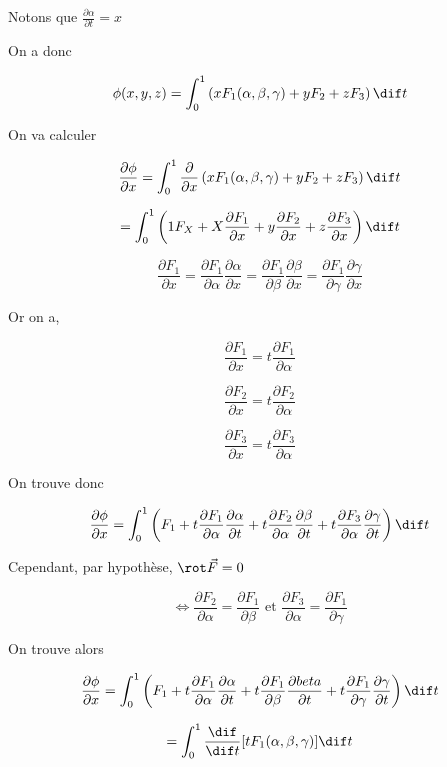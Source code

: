 Notons que $\frac{\partial \alpha}{\partial t} = x$

On a donc

\[\phi (x,y,z) = \int_0^1 \left( x F_1 (\alpha, \beta, \gamma ) + y F_2 + z F_3 \right) \dif t \]

On va calculer

\[\frac{\partial \phi}{\partial x} = \int_0^1 \frac{\partial}{\partial x} \left( x F_1 (\alpha, \beta, \gamma ) + y F_2 + z F_3 \right) \dif t\]

\[= \int_0^1 \left( 1F_X +X \frac{\partial F_1}{\partial x} + y \frac{\partial F_2}{\partial x} + z \frac{\partial F_3}{\partial x} \right) \dif t\]


\[
\frac{\partial F_1}{\partial x} = \frac{\partial F_1}{\partial \alpha} \frac{\partial \alpha}{\partial x}
=\frac{\partial F_1}{\partial \beta} \frac{\partial \beta}{\partial x}
=\frac{\partial F_1}{\partial \gamma} \frac{\partial \gamma}{\partial x}
\]

Or on a,

\[\frac{\partial F_1}{\partial x} = t \frac{\partial F_1}{\partial \alpha}\]

\[\frac{\partial F_2}{\partial x} = t \frac{\partial F_2}{\partial \alpha}\]

\[\frac{\partial F_3}{\partial x} = t \frac{\partial F_3}{\partial \alpha}\]

On trouve donc

\[\frac{\partial \phi}{\partial x}=\int_0^1 \left( F_1+t \frac{\partial F_1}{\partial \alpha} \frac{\partial \alpha}{\partial t}
+t \frac{\partial F_2}{\partial \alpha} \frac{\partial \beta}{\partial t}
+t \frac{\partial F_3}{\partial \alpha} \frac{\partial \gamma}{\partial t}
\right) \dif t
\]

Cependant, par hypothèse, $\rot \vec F = 0$

\[\Leftrightarrow  \frac{\partial F_2}{\partial \alpha} = \frac{\partial F_1}{\partial \beta} \text{ et }  \frac{\partial F_3}{\partial \alpha} = \frac{\partial F_1}{\partial \gamma} \]

On trouve alors

\[
\frac{\partial \phi}{\partial x}=\int_0^1 \left( F_1 +t \frac{\partial F_1}{\partial \alpha} \frac{\partial \alpha}{\partial t}
+t \frac{\partial F_1}{\partial \beta} \frac{\partial \\beta}{\partial t}
+t \frac{\partial F_1}{\partial \gamma} \frac{\partial \gamma}{\partial t}
\right) \dif t
\]

\[=\int_0^1 \frac{\dif }{\dif t}[t F_1 ( \alpha, \beta, \gamma ) ] \dif t \]

